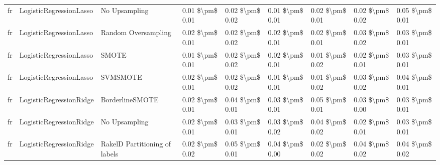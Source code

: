 \begin{tabular}{lllllllll}
      fr &         LogisticRegressionLasso &                 No Upsampling & 0.01 \$\textbackslash pm\$ 0.01 &           0.02 \$\textbackslash pm\$ 0.02 &       0.01 \$\textbackslash pm\$ 0.01 &        0.02 \$\textbackslash pm\$ 0.01 &                         0.02 \$\textbackslash pm\$ 0.02 &     0.05 \$\textbackslash pm\$ 0.01 \\
      fr &         LogisticRegressionLasso &           Random Oversampling & 0.02 \$\textbackslash pm\$ 0.01 &           0.02 \$\textbackslash pm\$ 0.02 &       0.02 \$\textbackslash pm\$ 0.01 &        0.02 \$\textbackslash pm\$ 0.01 &                         0.03 \$\textbackslash pm\$ 0.02 &     0.03 \$\textbackslash pm\$ 0.01 \\
      fr &         LogisticRegressionLasso &                         SMOTE & 0.01 \$\textbackslash pm\$ 0.01 &           0.02 \$\textbackslash pm\$ 0.02 &       0.02 \$\textbackslash pm\$ 0.01 &        0.01 \$\textbackslash pm\$ 0.02 &                         0.02 \$\textbackslash pm\$ 0.01 &     0.03 \$\textbackslash pm\$ 0.01 \\
      fr &         LogisticRegressionLasso &                      SVMSMOTE & 0.02 \$\textbackslash pm\$ 0.01 &           0.02 \$\textbackslash pm\$ 0.02 &       0.01 \$\textbackslash pm\$ 0.01 &        0.01 \$\textbackslash pm\$ 0.02 &                         0.03 \$\textbackslash pm\$ 0.02 &     0.04 \$\textbackslash pm\$ 0.01 \\
      fr &         LogisticRegressionRidge &               BorderlineSMOTE & 0.02 \$\textbackslash pm\$ 0.01 &           0.04 \$\textbackslash pm\$ 0.01 &       0.03 \$\textbackslash pm\$ 0.01 &        0.05 \$\textbackslash pm\$ 0.01 &                         0.03 \$\textbackslash pm\$ 0.00 &     0.03 \$\textbackslash pm\$ 0.01 \\
      fr &         LogisticRegressionRidge &                 No Upsampling & 0.02 \$\textbackslash pm\$ 0.01 &           0.03 \$\textbackslash pm\$ 0.01 &       0.03 \$\textbackslash pm\$ 0.02 &        0.04 \$\textbackslash pm\$ 0.02 &                         0.02 \$\textbackslash pm\$ 0.01 &     0.03 \$\textbackslash pm\$ 0.01 \\
      fr &         LogisticRegressionRidge & RakelD Partitioning of labels & 0.02 \$\textbackslash pm\$ 0.02 &           0.05 \$\textbackslash pm\$ 0.01 &       0.04 \$\textbackslash pm\$ 0.00 &        0.02 \$\textbackslash pm\$ 0.02 &                         0.04 \$\textbackslash pm\$ 0.02 &     0.04 \$\textbackslash pm\$ 0.02 \\

\end{tabular}
